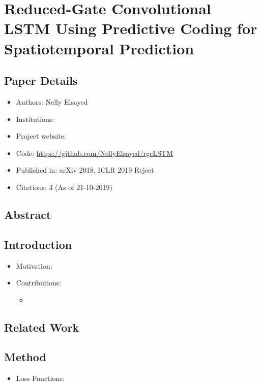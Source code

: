 \documentclass{article}
\begin{document}
    \section{Reduced-Gate Convolutional LSTM Using Predictive Coding for Spatiotemporal Prediction}\label{sec:Reduced_Gate_Convolutional_LSTM_Using_Predictive_Coding_for_Spatiotemporal_Prediction}
    \subsection*{Paper Details}
    \begin{itemize}
        \item Authors: Nelly Elsayed
        \item Institutions:
        \item Project website:
        \item Code: \url{https://github.com/NellyElsayed/rgcLSTM}
        \item Published in: arXiv 2018, ICLR 2019 Reject
        \item Citations: 3 (As of 21-10-2019)
    \end{itemize}

    \subsection*{Abstract}

    \subsection{Introduction}\label{subsec:Reduced_Gate_Convolutional_LSTM_Using_Predictive_Coding_for_Spatiotemporal_Prediction:introduction}
    \begin{itemize}
        \item Motivation:
        \item Contributions:
        \begin{itemize}
            \item
        \end{itemize}
    \end{itemize}

    \subsection{Related Work}\label{subsec:Reduced_Gate_Convolutional_LSTM_Using_Predictive_Coding_for_Spatiotemporal_Prediction:related-work}

    \subsection{Method}\label{subsec:Reduced_Gate_Convolutional_LSTM_Using_Predictive_Coding_for_Spatiotemporal_Prediction:method}
    \begin{itemize}
        \item Loss Functions:
    \end{itemize}
\end{document}
